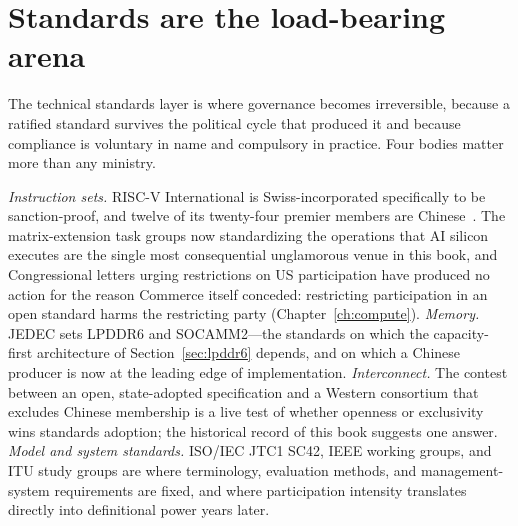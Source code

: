 \section{Standards are the load-bearing arena}

The technical standards layer is where governance becomes irreversible, because a ratified standard survives the political cycle that produced it and because compliance is voluntary in name and compulsory in practice. Four bodies matter more than any ministry.

\emph{Instruction sets.} RISC-V International is Swiss-incorporated specifically to be sanction-proof, and twelve of its twenty-four premier members are Chinese~\cite{csis-riscv}. The matrix-extension task groups now standardizing the operations that AI silicon executes are the single most consequential unglamorous venue in this book, and Congressional letters urging restrictions on US participation have produced no action for the reason Commerce itself conceded: restricting participation in an open standard harms the restricting party (Chapter~\ref{ch:compute}). \emph{Memory.} JEDEC sets LPDDR6 and SOCAMM2---the standards on which the capacity-first architecture of Section~\ref{sec:lpddr6} depends, and on which a Chinese producer is now at the leading edge of implementation. \emph{Interconnect.} The contest between an open, state-adopted specification and a Western consortium that excludes Chinese membership is a live test of whether openness or exclusivity wins standards adoption; the historical record of this book suggests one answer. \emph{Model and system standards.} ISO/IEC JTC1 SC42, IEEE working groups, and ITU study groups are where terminology, evaluation methods, and management-system requirements are fixed, and where participation intensity translates directly into definitional power years later.

